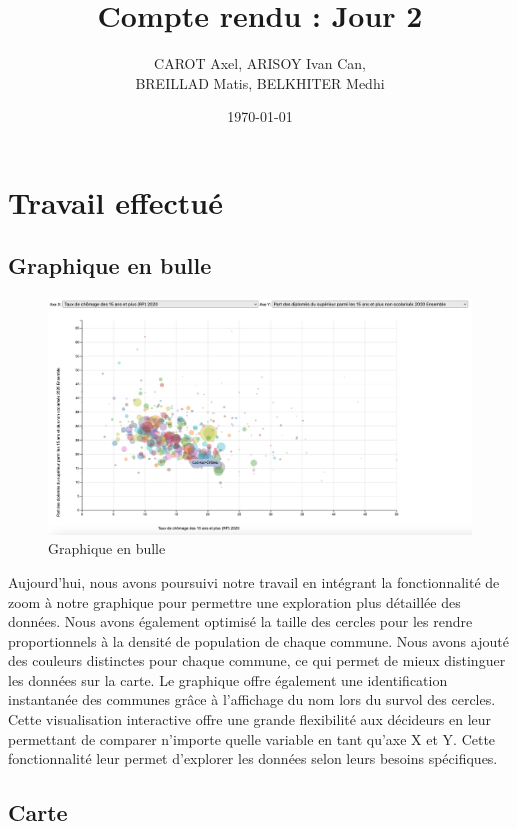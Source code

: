\documentclass{article}
\title{Compte rendu : Jour 2}
\author{CAROT Axel, ARISOY Ivan Can, \\ BREILLAD Matis, BELKHITER Medhi}
\date{\today}
\begin{document}
\maketitle

\section{Travail effectué}

\subsection{Graphique en bulle}

\begin{figure}[h]
    \centering
    \includegraphics[width=1\textwidth]{bulle.png}
    \caption{Graphique en bulle}
    \label{fig:kaggle}
\end{figure}

Aujourd'hui, nous avons poursuivi notre travail en intégrant la fonctionnalité de zoom à notre graphique pour permettre une exploration plus détaillée des données. Nous avons également optimisé la taille des cercles pour les rendre proportionnels à la densité de population de chaque commune. Nous avons ajouté des couleurs distinctes pour chaque commune, ce qui permet de mieux distinguer les données sur la carte. Le graphique offre également une identification instantanée des communes grâce à l'affichage du nom lors du survol des cercles. \\

Cette visualisation interactive offre une grande flexibilité aux décideurs en leur permettant de comparer n'importe quelle variable en tant qu'axe X et Y. Cette fonctionnalité leur permet d'explorer les données selon leurs besoins spécifiques.
\vspace{2cm}
\subsection{Carte}
\end{document}
